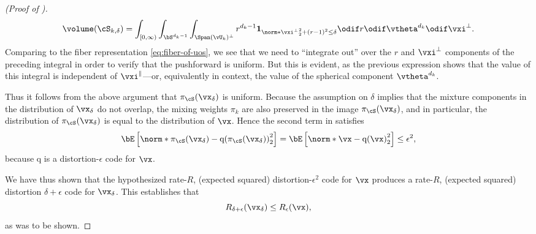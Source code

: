 \documentclass[../../book-main.tex]{subfiles}
\begin{document}
\begin{proof}[(Proof of )]
\begin{equation}
        \volume(\cS_{k, \delta})
        = \int_{[0, \infty)} \int_{\bS^{d_k-1}} \int_{\Span(\vU_k)^\perp} 
        r^{d_k-1}
        \mathbf{1}_{
            \norm*{\vxi^{\perp}}_2^2
            + \left( r - 1 \right)^2
            \leq
            \delta
        }
        \odif r \odif \vtheta^{d_k} \odif \vxi^{\perp}.
    \end{equation}
    Comparing to the fiber representation \eqref{eq:fiber-of-uos},
    we see that we need to ``integrate out'' over the $r$ and $\vxi^\perp$
    components of the preceding integral in order to verify that the pushforward
    is uniform.
    But this is evident, as the previous expression shows that the value of this
    integral is independent of $\vxi^\|$---or, equivalently in context, the
    value of the spherical component $\vtheta^{d_k}$.

    Thus it follows from the above argument that $\pi_{\cS}(\vx_{\delta})$ is
    uniform.
    Because the assumption on $\delta$ implies that the mixture components in
    the distribution of $\vx_{\delta}$ do not overlap, the mixing weights
    $\pi_k$ are also preserved in the image $\pi_{\cS}(\vx_{\delta})$, and in
    particular, the distribution of $\pi_{\cS}(\vx_{\delta})$ is equal to the
    distribution of $\vx$.
    Hence the second term in  satisfies
    \begin{equation}
        \bE\left[ \norm*{ \pi_{\cS}(\vx_{\delta}) - \mathrm{q}(\pi_{\cS}(\vx_{\delta})) }_2^2 \right]
        =
        \bE\left[ \norm*{ \vx - \mathrm{q}(\vx) }_2^2 \right]
        \leq
        \epsilon^2,
    \end{equation}
    because $\mathrm{q}$ is a distortion-$\epsilon$ code for $\vx$.

    We have thus shown that the hypothesized rate-$R$, (expected squared)
    distortion-$\epsilon^2$ code for $\vx$ produces a rate-$R$, (expected
    squared) distortion $\delta + \epsilon$ code for $\vx_{\delta}$.
    This establishes that
    \begin{equation}
        R_{\delta + \epsilon}(\vx_{\delta})
        \leq
        R_{\epsilon}(\vx),
    \end{equation}
    as was to be shown.


\end{proof}
\end{document}
